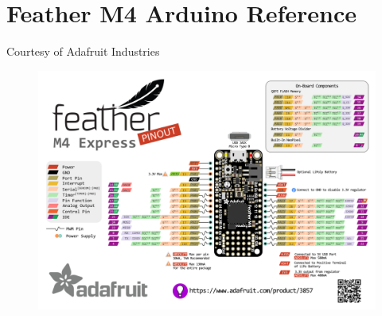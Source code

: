 \documentclass{article}
\begin{document}
\section{Feather M4 Arduino Reference}
Courtesy of Adafruit Industries
\begin{figure}[H]
    \centering
    \includegraphics[width=\textwidth]{images/arduino_compatibles_Feather_M4_Page.png}
    \label{fig:m4-pinout}
\end{figure}
\end{document}
